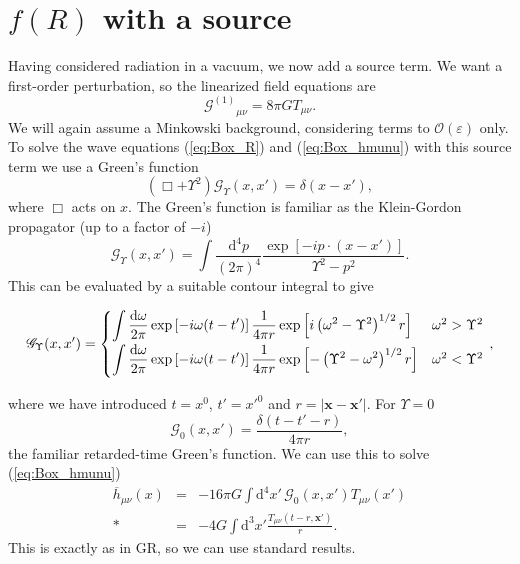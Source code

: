 \documentclass[aps,prd,amsfonts,amssymb,amsmath,nofootinbib,reprint,showpacs]{revtex4-1}
\newcommand{\eqnref}[1]{(\ref{eq:#1})}
\newcommand{\dd}{\ensuremath{\text{d}}}
\newcommand{\recip}[1]{\ensuremath{\frac{1}{#1}}}
\newcommand{\order}[1]{\ensuremath{\mathcal{O}({#1})}}
\begin{document}
\section{$f(R)$ with a source\label{sec:Source}}

Having considered radiation in a vacuum, we now add a source term. We want a first-order perturbation, so the linearized field equations are
\begin{equation}
 {\mathcal{G}^{(1)}}_{\mu\nu} = 8\pi G T_{\mu\nu}.
\end{equation}
We will again assume a Minkowski background, considering terms to $\order{\varepsilon}$ only. To solve the wave equations \eqnref{Box_R} and \eqnref{Box_hmunu} with this source term we use a Green's function
\begin{equation}
\left(\Box + \Upsilon^2\right)\mathscr{G}_\Upsilon(x, x') = \delta(x - x'),
\end{equation}
where $\Box$ acts on $x$. The Green's function is familiar as the Klein-Gordon propagator (up to a factor of $-i$)~\cite{Peskin1995a}
\begin{equation}
\mathscr{G}_\Upsilon(x, x') = \int \frac{\dd^4 p}{(2\pi)^4} \frac{\exp\left[-ip\cdot(x-x')\right]}{\Upsilon^2 - p^2}.
\end{equation}
This can be evaluated by a suitable contour integral to give
\begin{widetext}
\begin{equation}
\mathscr{G}_\Upsilon(x, x') =
\begin{cases}
{\displaystyle \int{\frac{\dd \omega}{2\pi} \exp\left[-i\omega(t-t')\right]\recip{4\pi r}\exp\left[i\left(\omega^2 - \Upsilon^2\right)^{1/2}r\right]}} & \omega^2 > \Upsilon^2\vspace{0.8mm}\\
{\displaystyle \int{\frac{\dd \omega}{2\pi} \exp\left[-i\omega(t-t')\right]\recip{4\pi r}\exp\left[-\left(\Upsilon^2 - \omega^2\right)^{1/2}r\right]}} & \omega^2 < \Upsilon^2\vspace{0.8mm}
\end{cases}\, ,
\label{eq:Green}
\end{equation}
\end{widetext}
where we have introduced $t = x^0$, $t' = x'^0$ and $r = |\boldsymbol{x} - \boldsymbol{x'}|$. For $\Upsilon = 0$
\begin{equation}
\mathscr{G}_0(x, x') = \frac{\delta(t - t' - r)}{4 \pi r},
\end{equation}
the familiar retarded-time Green's function. We can use this to solve \eqnref{Box_hmunu}
\begin{eqnarray}
\overline{h}_{\mu\nu}(x) & = & -16 \pi G \int \dd^4 x'\, \mathscr{G}_0(x, x') T_{\mu\nu}(x') \nonumber \\*
 & = & -4 G \int \dd^3 x' \frac{T_{\mu\nu}(t - r, \boldsymbol{x'})}{r}.
\end{eqnarray}
This is exactly as in GR, so we can use standard results.
\end{document}
